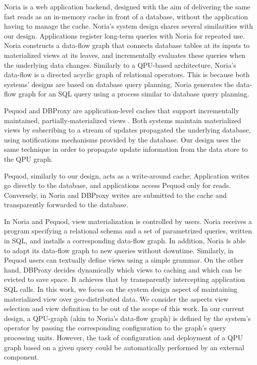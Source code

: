 Noria \cite{gjengset:noria} is a web application backend,
designed with the aim of delivering the same fast reads as an in-memory cache in front of a database,
without the application having to manage the cache.
Noria's system design shares several similarities with our design.
Applications register long-term queries with Noria for repeated use.
Noria constructs a data-flow graph that connects database tables at its inputs to materialized views at its leaves,
and incrementally evaluates these queries when the underlying data changes.
Similarly to a QPU-based architecture, Noria’s data-flow is a directed acyclic graph of relational operators.
This is because both systems' designs are based on database query planning.
Noria generates the data-flow graph for an SQL query using a process similar to database query planning.

Pequod \cite{kate:pequod} and DBProxy \cite{amiri:dbproxy} are application-level caches that support incrementally
maintained, partially-materialized views \cite{zhou:dynamicmv}.
Both systems maintain materialized views by subscribing to a stream of updates propagated the underlying database,
using notifications mechanisms provided by the database.
Our design uses the same technique in order to propagate update information from the data store to the QPU graph.

Pequod, similarly to our design, acts as a write-around cache;
Application writes go directly to the database, and applications access Pequod only for reads.
Conversely, in Noria and DBProxy writes are submitted to the cache and transparently forwarded to the database.

In Noria and Pequod, view materialization is controlled by users.
Noria receives a program specifying a relational schema and a set of parametrized queries, written in SQL,
and installs a corresponding data-flow graph.
In addition, Noria is able to adapt its data-flow graph to new queries without downtime.
Similarly, in Pequod users can textually define views using a simple grammar.
On the other hand, DBProxy decides dynamically which views to caching and which can be evicted to save space.
It achieves that by transparently intercepting application SQL calls.
In this work, we focus on the system design aspect of maintaining materialized view over geo-distributed data.
We consider the aspects view selection and view definition to be out of the scope of this work.
In our current design, a QPU-graph (akin to Noria's data-flow graph) is defined by the system's operator by passing
the corresponding configuration to the graph's query processing units.
However, the task of configuration and deployment of a QPU graph based on a given query could be automatically performed
by an external component.

